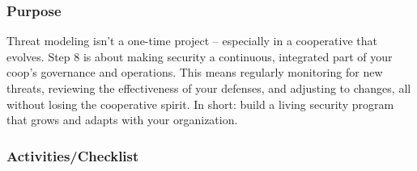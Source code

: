 \subsubsection{Purpose}

Threat modeling isn't a one-time project – especially in a cooperative that
evolves. Step 8 is about making security a continuous, integrated part of your
coop's governance and operations. This means regularly monitoring for new
threats, reviewing the effectiveness of your defenses, and adjusting to changes,
all without losing the cooperative spirit. In short: build a living security
program that grows and adapts with your organization.

\subsubsection{Activities/Checklist}

